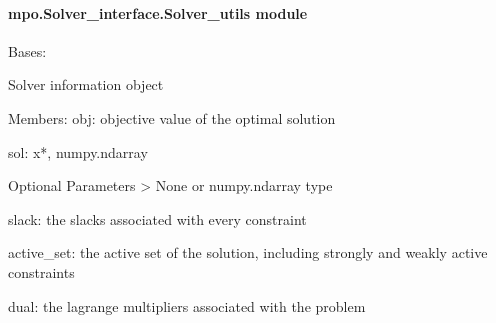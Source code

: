 \documentclass[letterpaper,10pt,english]{sphinxmanual}
\begin{document}
\paragraph{mpo.Solver\_interface.Solver\_utils module}
\label{\detokenize{mpo.solver_interface:module-mpo.solver_interface.solver_utils}}\label{\detokenize{mpo.solver_interface:mpo-Solver-interface-Solver-utils-module}}

\begin{fulllineitems}
\label{\detokenize{mpo.solver_interface:mpo.solver_interface.solver_utils.SolverOutput}}
\sphinxAtStartPar
Bases: 

\sphinxAtStartPar
Solver information object

\sphinxAtStartPar
Members:
obj: objective value of the optimal solution

\sphinxAtStartPar
sol: x*, numpy.ndarray

\sphinxAtStartPar
Optional Parameters \sphinxhyphen{}\textgreater{} None or numpy.ndarray type

\sphinxAtStartPar
slack: the slacks associated with every constraint

\sphinxAtStartPar
active\_set: the active set of the solution, including strongly and weakly active constraints

\sphinxAtStartPar
dual: the lagrange multipliers associated with the problem


\end{fulllineitems}
\end{document}
